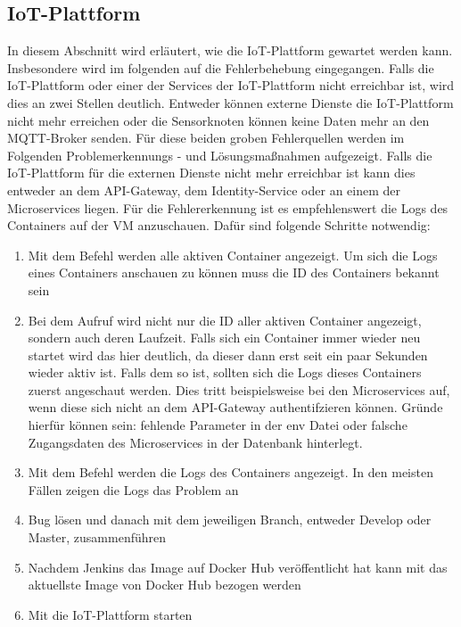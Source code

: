 \subsection{IoT-Plattform}
In diesem Abschnitt wird erläutert, wie die IoT-Plattform gewartet werden kann. 
Insbesondere wird im folgenden auf die Fehlerbehebung eingegangen. 
Falls die IoT-Plattform oder einer der Services der IoT-Plattform nicht erreichbar ist, wird dies an zwei Stellen deutlich. Entweder können externe Dienste die IoT-Plattform nicht mehr erreichen oder die Sensorknoten können keine Daten mehr an den MQTT-Broker senden. Für diese beiden groben Fehlerquellen werden im Folgenden Problemerkennungs - und Lösungsmaßnahmen aufgezeigt. \newline
Falls die IoT-Plattform für die externen Dienste nicht mehr erreichbar ist kann dies entweder an dem API-Gateway, dem Identity-Service oder an einem der Microservices liegen. 
Für die Fehlererkennung ist es empfehlenswert die Logs des Containers auf der VM anzuschauen. Dafür sind folgende Schritte notwendig:
\begin{enumerate}
	\item Mit dem Befehl  werden alle aktiven Container angezeigt. Um sich die Logs eines Containers anschauen zu können muss die ID des Containers bekannt sein
	\item Bei dem Aufruf wird nicht nur die ID aller aktiven Container angezeigt, sondern auch deren Laufzeit. Falls sich ein Container immer wieder neu startet wird das hier deutlich, da dieser dann erst seit ein paar Sekunden wieder aktiv ist. Falls dem so ist, sollten sich die Logs dieses Containers zuerst angeschaut werden. Dies tritt beispielsweise bei den Microservices auf, wenn diese sich nicht an dem API-Gateway authentifzieren können. Gründe hierfür können sein: fehlende Parameter in der env Datei oder falsche Zugangsdaten des Microservices in der Datenbank hinterlegt.
	\item Mit dem Befehl  werden die Logs des Containers angezeigt. In den meisten Fällen zeigen die Logs das Problem an
	\item Bug lösen und danach mit dem jeweiligen Branch, entweder Develop oder Master, zusammenführen
	\item Nachdem Jenkins das Image auf Docker Hub veröffentlicht hat kann mit  das aktuellste Image von Docker Hub bezogen werden
	\item Mit  die IoT-Plattform starten
\end{enumerate}
